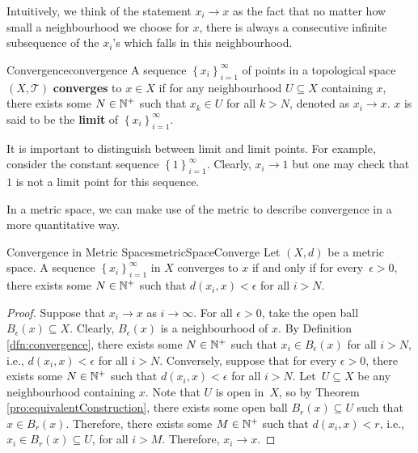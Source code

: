 \documentclass[math]{amznotes}
\theoremstyle{remark}
\begin{document}
Intuitively, we think of the statement $x_i \to x$ as the fact that no matter how small a neighbourhood we choose for $x$, there is always a consecutive infinite subsequence of the $x_i$'s which falls in this neighbourhood.
\begin{dfnbox}{Convergence}{convergence}
    A sequence $\left\{x_i\right\}_{i = 1}^{\infty}$ of points in a topological space $\left(X, \mathcal{T}\right)$ {\color{red} \textbf{converges}} to $x \in X$ if for any neighbourhood $U \subseteq X$ containing $x$, there exists some $N \in \mathbb{N}^+$ such that $x_k \in U$ for all $k > N$, denoted as $x_i \to x$. $x$ is said to be the {\color{red} \textbf{limit}} of $\left\{x_i\right\}_{i = 1}^{\infty}$.
\end{dfnbox}
It is important to distinguish between limit and limit points. For example, consider the constant sequence $\left\{1\right\}_{i = 1}^{\infty}$. Clearly, $x_i \to 1$ but one may check that $1$ is not a limit point for this sequence.

In a metric space, we can make use of the metric to describe convergence in a more quantitative way.
\begin{thmbox}{Convergence in Metric Spaces}{metricSpaceConverge}
    Let $\left(X, d\right)$ be a metric space. A sequence $\left\{x_i\right\}_{i = 1}^{\infty}$ in $X$ converges to $x$ if and only if for every~$\epsilon > 0$, there exists some $N \in \mathbb{N}^+$ such that $d\left(x_i, x\right) < \epsilon$ for all $i > N$.
    \tcblower
    \begin{proof}
        Suppose that $x_i \to x$ as $i \to \infty$. For all $\epsilon > 0$, take the open ball $B_{\epsilon}\left(x\right) \subseteq X$. Clearly, $B_{\epsilon}\left(x\right)$ is a neighbourhood of $x$. By Definition \ref{dfn:convergence}, there exists some $N \in \mathbb{N}^+$ such that $x_i \in B_{\epsilon}\left(x\right)$ for all $i > N$, i.e., $d\left(x_i, x\right) < \epsilon$ for all $i > N$. Conversely, suppose that for every $\epsilon > 0$, there exists some $N \in \mathbb{N}^+$ such that $d\left(x_i, x\right) < \epsilon$ for all $i > N$. Let~$U \subseteq X$ be any neighbourhood containing $x$. Note that $U$ is open in~$X$, so by Theorem \ref{pro:equivalentConstruction}, there exists some open ball $B_r\left(x\right) \subseteq U$ such that $x \in B_r\left(x\right)$. Therefore, there exists some $M \in \mathbb{N}^+$ such that $d\left(x_i, x\right) < r$, i.e., $x_i \in B_r\left(x\right) \subseteq U$, for all $i > M$. Therefore, $x_i \to x$.
    \end{proof}
\end{thmbox}
\end{document}
